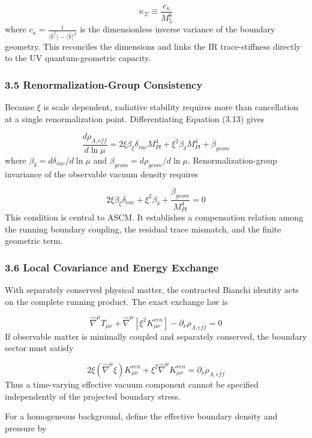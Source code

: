 \documentclass[aps,prd,onecolumn,superscriptaddress,nofootinbib,longbibliography,10pt]{revtex4-2}
\begin{document}
  \[ \kappa_\Sigma \equiv \frac{c_\kappa}{M_5^8} \]
  where \(c_\kappa = \frac{1}{\langle \hat{V}^2 \rangle - \langle \hat{V} \rangle^2}\) is the dimensionless inverse variance of the boundary geometry. This reconciles the dimensions and links the IR trace-stiffness directly to the UV quantum-geometric capacity.



  
\subsubsection*{3.5 Renormalization-Group Consistency}

  Because \(\xi\) is scale dependent, radiative stability requires more than cancellation at a single renormalization point. Differentiating Equation (3.13) gives


  \[ \frac{d\rho_{\Lambda,eff}}{d\ln\mu} = 2\xi\beta_\xi \delta_{vac} M_{Pl}^4 + \xi^2 \beta_\delta M_{Pl}^4 + \beta_{geom} \]
  where \(\beta_\delta = d\delta_{vac}/d\ln\mu\) and \(\beta_{geom} = d\rho_{geom}/d\ln\mu\). Renormalization-group invariance of the observable vacuum density requires


  \[ 2\xi\beta_\xi \delta_{vac} + \xi^2 \beta_\delta + \frac{\beta_{geom}}{M_{Pl}^4} = 0 \]
  This condition is central to ASCM. It establishes a compensation relation among the running boundary coupling, the residual trace mismatch, and the finite geometric term.



  
\subsubsection*{3.6 Local Covariance and Energy Exchange}

  With separately conserved physical matter, the contracted Bianchi identity acts on the complete running product. The exact exchange law is


  \[ \hat{\nabla}^\mu T_{\mu\nu} + \hat{\nabla}^\mu[\xi^2 K^{ren}_{\mu\nu}] - \partial_\nu \rho_{\Lambda,eff} = 0 \]
  If observable matter is minimally coupled and separately conserved, the boundary sector must satisfy


  \[ 2\xi(\hat{\nabla}^\mu \xi) K^{ren}_{\mu\nu} + \xi^2 \hat{\nabla}^\mu K^{ren}_{\mu\nu} = \partial_\nu \rho_{\Lambda,eff} \]
  Thus a time-varying effective vacuum component cannot be specified independently of the projected boundary stress.


  For a homogeneous background, define the effective boundary density and pressure by
\end{document}
